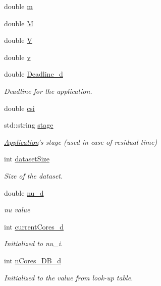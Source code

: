 \begin{DoxyCompactItemize}
double \hyperlink{classApplication_ab903d83d3cde51569a27f97752c9f158}{m}
\item 
double \hyperlink{classApplication_a14904a2abf46cc0a50eb82043fa0912e}{M}
\item 
double \hyperlink{classApplication_aa92ad37e6701931176e0dc9b260fd7ee}{V}
\item 
double \hyperlink{classApplication_a9efc167094a42382504dd28a7ac402e0}{v}
\item 
double \hyperlink{classApplication_a2a989ae288a74ee5250b5acf449c864a}{Deadline\-\_\-d}
\begin{DoxyCompactList}\small\item\em Deadline for the application. \end{DoxyCompactList}\item 
double \hyperlink{classApplication_a20adc533c6b6147342b3f60dc0fbd9bc}{csi}
\item 
std\-::string \hyperlink{classApplication_adb1cba2c06695bfdf81482dfba449d5b}{stage}
\begin{DoxyCompactList}\small\item\em \hyperlink{classApplication}{Application}'s stage (used in case of residual time) \end{DoxyCompactList}\item 
int \hyperlink{classApplication_aaa155e818d807f585d83ecacf4abfe42}{dataset\-Size}
\begin{DoxyCompactList}\small\item\em Size of the dataset. \end{DoxyCompactList}\item 
double \hyperlink{classApplication_a42c22b9a3130cf1f2722ce222f2e5bae}{nu\-\_\-d}
\begin{DoxyCompactList}\small\item\em nu value \end{DoxyCompactList}\item 
int \hyperlink{classApplication_adee341a84a5389dfd4d16e7f8e697190}{current\-Cores\-\_\-d}
\begin{DoxyCompactList}\small\item\em Initialized to nu\-\_\-i. \end{DoxyCompactList}\item 
int \hyperlink{classApplication_a95104d330c9c7ed2c1017b4938a39a9a}{n\-Cores\-\_\-\-D\-B\-\_\-d}
\begin{DoxyCompactList}\small\item\em Initialized to the value from look-\/up table. \end{DoxyCompactList}\item 

\end{DoxyCompactItemize}
